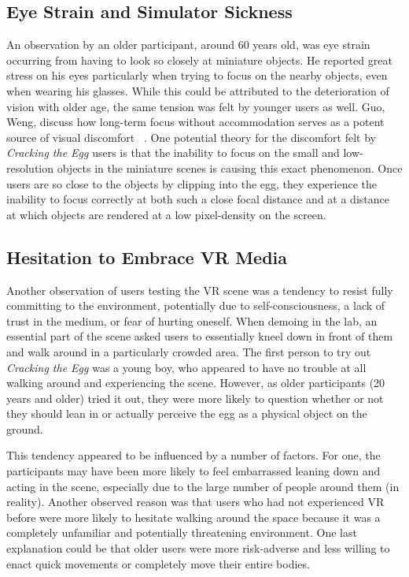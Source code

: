 \documentclass[10pt,twocolumn,letterpaper]{article}
\begin{document}
\subsection{Eye Strain and Simulator Sickness} \label{eyestrain}

An observation by an older participant, around 60 years old, was eye strain occurring from having to look so closely at miniature objects. He reported great stress on his eyes particularly when trying to focus on the nearby objects, even when wearing his glasses. While this could be attributed to the deterioration of vision with older age, the same tension was felt by younger users as well. Guo, Weng, \etal discuss how long-term focus without accommodation serves as a potent source of visual discomfort ~\cite{7892270}. One potential theory for the discomfort felt by \textit{Cracking the Egg} users is that the inability to focus on the small and low-resolution objects in the miniature scenes is causing this exact phenomenon. Once users are so close to the objects by clipping into the egg, they experience the inability to focus correctly at both such a close focal distance and at a distance at which objects are rendered at a low pixel-density on the screen.

\subsection{Hesitation to Embrace VR Media}

Another observation of users testing the VR scene was a tendency to resist fully committing to the environment, potentially due to self-consciousness, a lack of trust in the medium, or fear of hurting oneself. When demoing in the lab, an essential part of the scene asked users to essentially kneel down in front of them and walk around in a particularly crowded area. The first person to try out \textit{Cracking the Egg} was a young boy, who appeared to have no trouble at all walking around and experiencing the scene. However, as older participants (20 years and older) tried it out, they were more likely to question whether or not they should lean in or actually perceive the egg as a physical object on the ground.

This tendency appeared to be influenced by a number of factors. For one, the participants may have been more likely to feel embarrassed leaning down and acting in the scene, especially due to the large number of people around them (in reality). Another observed reason was that users who had not experienced VR before were more likely to hesitate walking around the space because it was a completely unfamiliar and potentially threatening environment. One last explanation could be that older users were more risk-adverse and less willing to enact quick movements or completely move their entire bodies.
\end{document}
